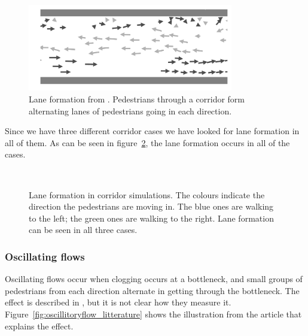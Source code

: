 \begin{figure}[h]
    \centering
    \includegraphics[width=0.8\textwidth]{Figures/flow_lanes_litterature.png}
    \caption[Lane formation from \cite{lanes}]{Lane formation from 
    \cite{lanes}. Pedestrians through a corridor form alternating lanes of 
    pedestrians going in each direction.}
    \label{fig:lanes-literature}
\end{figure}

Since we have three different corridor cases we have looked for lane
formation in all of them. As can be seen in figure~\ref{fig:laneformation}, 
the lane formation occurs in all of the cases.

\begin{figure}[h]
    \centering
    \\
    \caption[Lane formation in corridor simulations]{Lane formation in 
    corridor simulations. The colours indicate the direction the pedestrians 
    are moving in. The blue ones are walking to the left; the green ones 
    are walking to the right. Lane formation can be seen in all three cases. }
    \label{fig:laneformation}
\end{figure}

\subsubsection{Oscillating flows}
Oscillating flows occur when clogging occurs at a bottleneck, and small groups 
of pedestrians from each direction alternate in getting through the 
bottleneck. The effect is described in \cite{oscil}, but it is not clear how 
they measure it. Figure~\ref{fig:oscillitoryflow_litterature} shows the 
illustration from the article that explains the effect.

